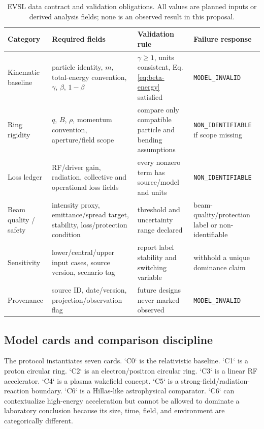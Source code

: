 \documentclass[conference]{../../../../Conference-LaTeX-template_10-17-19/IEEEtran}
\begin{document}
\begin{table}[!t]
\caption{EVSL data contract and validation obligations. All values are planned inputs or derived analysis fields; none is an observed result in this proposal.}
\label{tab:variables}
\centering
\small
\begin{tabularx}{\textwidth}{lYYY}
\toprule
Category & Required fields & Validation rule & Failure response \\
\midrule
Kinematic baseline & particle identity, $m$, total-energy convention, $\gamma$, $\beta$, $1-\beta$ & $\gamma\geq1$, units consistent, Eq. \eqref{eq:beta-energy} satisfied & \texttt{MODEL\_INVALID} \\
Ring rigidity & $q$, $B$, $\rho$, momentum convention, aperture/field scope & compare only compatible particle and bending assumptions & \texttt{NON\_IDENTIFIABLE} if scope missing \\
Loss ledger & RF/driver gain, radiation, collective and operational loss fields & every nonzero term has source/model and units & \texttt{NON\_IDENTIFIABLE} \\
Beam quality / safety & intensity proxy, emittance/spread target, stability, loss/protection condition & threshold and uncertainty range declared & beam-quality/protection label or non-identifiable \\
Sensitivity & lower/central/upper input cases, source version, scenario tag & report label stability and switching variable & withhold a unique dominance claim \\
Provenance & source ID, date/version, projection/observation flag & future designs never marked observed & \texttt{MODEL\_INVALID} \\
\bottomrule
\end{tabularx}
\end{table}

\subsection{Model cards and comparison discipline}
The protocol instantiates seven cards. `C0` is the relativistic baseline. `C1` is a proton circular ring. `C2` is an electron/positron circular ring. `C3` is a linear RF accelerator. `C4` is a plasma wakefield concept. `C5` is a strong-field/radiation-reaction boundary. `C6` is a Hillas-like astrophysical comparator. `C6` can contextualize high-energy acceleration but cannot be allowed to dominate a laboratory conclusion because its size, time, field, and environment are categorically different.
\end{document}
